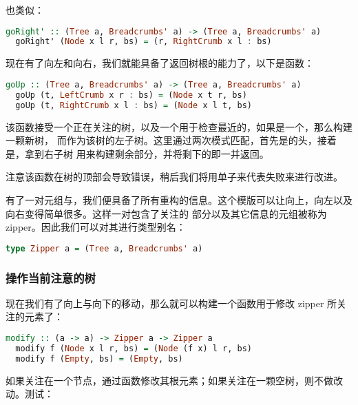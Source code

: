 \documentclass[./main.tex]{subfiles}
\begin{document}
也类似：

\begin{lstlisting}[language=Haskell]
  goRight' :: (Tree a, Breadcrumbs' a) -> (Tree a, Breadcrumbs' a)
  goRight' (Node x l r, bs) = (r, RightCrumb x l : bs)
\end{lstlisting}

现在有了向左和向右，我们就能具备了返回树根的能力了，以下是函数：

\begin{lstlisting}[language=Haskell]
  goUp :: (Tree a, Breadcrumbs' a) -> (Tree a, Breadcrumbs' a)
  goUp (t, LeftCrumb x r : bs) = (Node x t r, bs)
  goUp (t, RightCrumb x l : bs) = (Node x l t, bs)
\end{lstlisting}

该函数接受一个正在关注的树，以及一个用于检查最近的，如果是一个，那么构建一颗新树，
而作为该树的左子树。这里通过两次模式匹配，首先是的头，接着是，拿到右子树
用来构建剩余部分，并将剩下的即一并返回。

注意该函数在树的顶部会导致错误，稍后我们将用单子来代表失败来进行改进。

有了一对元组与，我们便具备了所有重构的信息。这个模版可以让向上，向左以及向右变得简单很多。这样一对包含了关注的
部分以及其它信息的元组被称为 zipper。因此我们可以对其进行类型别名：

\begin{lstlisting}[language=Haskell]
  type Zipper a = (Tree a, Breadcrumbs' a)
\end{lstlisting}

\subsubsection*{操作当前注意的树}

现在我们有了向上与向下的移动，那么就可以构建一个函数用于修改 zipper 所关注的元素了：

\begin{lstlisting}[language=Haskell]
  modify :: (a -> a) -> Zipper a -> Zipper a
  modify f (Node x l r, bs) = (Node (f x) l r, bs)
  modify f (Empty, bs) = (Empty, bs)
\end{lstlisting}

如果关注在一个节点，通过函数修改其根元素；如果关注在一颗空树，则不做改动。测试：
\end{document}
